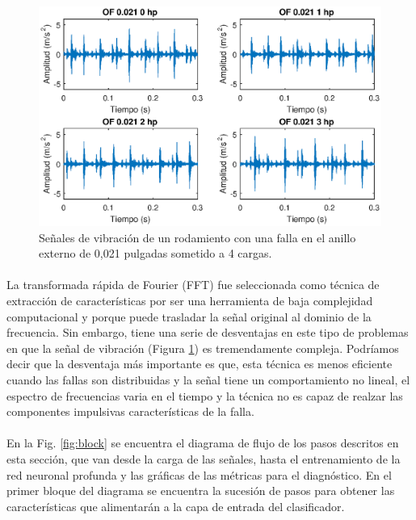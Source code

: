 \documentclass[12pt]{article}
\begin{document}
\begin{figure}[ht]
  \centering
    \includegraphics[scale=0.9]{./signalOF.eps}
  \caption{Señales de vibración de un rodamiento con una falla en el anillo externo de 0,021 pulgadas sometido a 4 cargas.}
  \label{fig:senales}
\end{figure}

\paragraph{}
La transformada rápida de Fourier (FFT) fue seleccionada como técnica de extracción de características por ser una herramienta de baja complejidad computacional y porque puede trasladar la señal original al dominio de la frecuencia. Sin embargo, tiene una serie de desventajas en este tipo de problemas en que la señal de vibración (Figura \ref{fig:senales}) es tremendamente compleja. Podríamos decir que la desventaja más importante es que, esta técnica es menos eficiente cuando las fallas son distribuidas y la señal tiene un comportamiento no lineal, el espectro de frecuencias varia en el tiempo y la técnica no es capaz de realzar las componentes impulsivas características de la falla.

\paragraph{}
En la Fig. \ref{fig:block} se encuentra el diagrama de flujo de los pasos descritos en esta sección, que van desde la carga de las señales, hasta el entrenamiento de la red neuronal profunda y las gráficas de las métricas para el diagnóstico. En el primer bloque del diagrama se encuentra la sucesión de pasos para obtener las características que alimentarán a la capa de entrada del clasificador.
\end{document}
